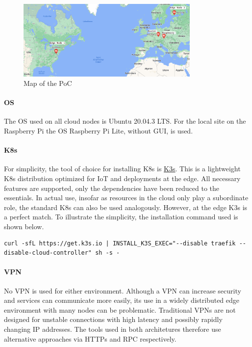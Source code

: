\documentclass[MIC,Master,english]{twbook}%
\begin{document}
\begin{figure}[ht]
    \centering
    \includegraphics[width=0.80\textwidth]{PICs/poc-map.png}
    \caption{Map of the \ac{PoC}\cite{googlemaps}}
    \label{fig:poc-map}
\end{figure}

\paragraph{OS} The \ac{OS} used on all cloud nodes is Ubuntu 20.04.3 LTS. For the local site on the Raspberry Pi the \ac{OS} Raspberry Pi Lite, without \ac{GUI}, is used.

\paragraph{\ac{K8s}} For simplicity, the tool of choice for installing \ac{K8s} is \hyperref{https://k3s.io/}{}{}{K3s}. This is a lightweight \ac{K8s} distribution optimized for \ac{IoT} and deployments at the edge. All necessary features are supported, only the dependencies have been reduced to the essentials. In actual use, insofar as resources in the cloud only play a subordinate role, the standard \ac{K8s} can also be used analogously. However, at the edge K3s is a perfect match. To illustrate the simplicity, the installation command used is shown below. 

\begin{lstlisting}[caption={K3s installation},captionpos=b]
curl -sfL https://get.k3s.io | INSTALL_K3S_EXEC="--disable traefik --disable-cloud-controller" sh -s -
\end{lstlisting}

\paragraph{VPN} No \ac{VPN} is used for either environment. Although a VPN can increase security and services can communicate more easily, its use in a widely distributed edge environment with many nodes can be problematic. Traditional VPNs are not designed for unstable connections with high latency and possibly rapidly changing \ac{IP} addresses. The tools used in both architetures therefore use alternative approaches via HTTPs and RPC respectively.
\end{document}
